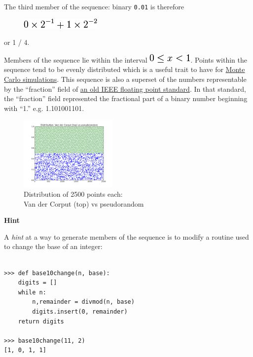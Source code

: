 The third member of the sequence: binary \texttt{0.01} is therefore

\begin{figure}[H]
  \centering
   \includegraphics[scale=.6]{graphics/225bf69a6a0712ec19f474be5f28bd71.png}  
\end{figure}

or 1 / 4.

Members of the sequence lie within the interval
\includegraphics[scale=.6]{graphics/9df79dd98e1387bb25dc94ef7c0edcb3.png}.
Points within the sequence tend to be evenly distributed which is a
useful trait to have for
\href{http://en.wikipedia.org/wiki/Monte\_Carlo\_method}{Monte Carlo
simulations}. This sequence is also a superset of the numbers
representable by the ``fraction'' field of
\href{http://en.wikipedia.org/wiki/IEEE\_754-1985}{an old IEEE floating
point standard}. In that standard, the ``fraction'' field represented
the fractional part of a binary number beginning with ``1.'' e.g.
1.101001101.

\begin{figure}[H]
  \centering
   \includegraphics{graphics/180px-Van_der_corput_distribution.png}  
   \caption{Distribution of 2500 points each: \\Van der Corput (top) vs pseudorandom}
\end{figure}


\pagebreak{}
\textbf{Hint}

A \emph{hint} at a way to generate members of the sequence is to modify
a routine used to change the base of an integer:

\begin{verbatim}

>>> def base10change(n, base):
	digits = []
	while n:
		n,remainder = divmod(n, base)
		digits.insert(0, remainder)
	return digits
 
>>> base10change(11, 2)
[1, 0, 1, 1]

\end{verbatim}


